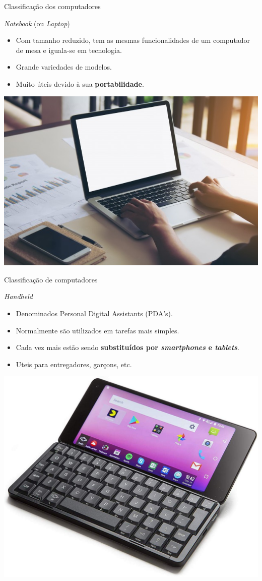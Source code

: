 \begin{frame}{Classificação dos computadores}
	\begin{block}{\textit{Notebook} (ou \textit{Laptop})}
		\begin{itemize}
			\item Com tamanho reduzido, tem as mesmas funcionalidades de um computador de mesa e iguala-se em tecnologia.
			\item Grande variedades de modelos.
			\item Muito úteis devido à sua \textbf{portabilidade}.
		\end{itemize}
	\end{block}

	\centering
	\includegraphics[width=0.6\linewidth]{Figuras/Ch01/fig3.1}
\end{frame}


\begin{frame}{Classificação de computadores}
	\begin{block}{\textit{Handheld}}
		\begin{itemize}
			\item Denominados Personal Digital Assistants (PDA's).
			\item Normalmente são utilizados em tarefas mais simples.
			\item Cada vez mais estão sendo \textbf{substituídos por \textit{smartphones }e \textit{tablets}}.
			\item Uteis para entregadores, garçons, etc.
		\end{itemize}
	\end{block}

	\medskip

	\centering
	\includegraphics[width=0.45\linewidth]{Figuras/Ch01/fig21}
\end{frame}


